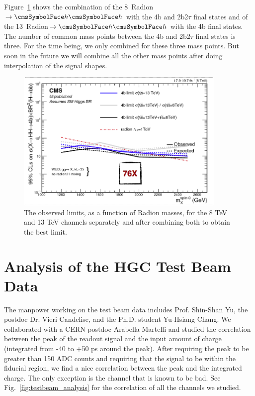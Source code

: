 Figure~\ref{fig:combinedhh4b} shows the combination of the 8~\TeV Radion$\rightarrow\Ph\Ph$ with 
the 4b and 2b2$\tau$ final states and of the 13~\TeV Radion$\rightarrow\Ph\Ph$ with the 4b final 
states. The number of common mass points between the  4b and 2b2$\tau$ final states is three. For the 
time being, we only combined for these three mass points. But soon in the future we will 
combine all the other mass points after doing interpolation of the signal shapes.

\begin{figure}[htbp]
   \centering
   \includegraphics[width=0.9\textwidth]{figures/hh_combined.png}
   \caption{The observed limits, as a function of Radion masses, for the 8 TeV and 13 TeV channels separately 
and after combining both to obtain the best limit.}
   \label{fig:combinedhh4b}
\end{figure}


\section{Analysis of the HGC Test Beam Data}
The manpower working on the test beam data includes Prof. Shin-Shan Yu, the postdoc Dr. Vieri Candelise, and the 
Ph.D. student Yu-Hsiang Chang. We collaborated with a CERN postdoc Arabella Martelli and studied the correlation 
between the peak of the readout signal and the input amount of charge (integrated from -40 to +50 ps around the 
peak). After requiring the peak to be greater than 150 ADC counts and requiring that the signal to be within the 
fiducial region, we find a nice correlation between the peak and the integrated charge. The only exception is 
the channel that is known to be bad.
See Fig.~\ref{fig:testbeam_analysis} for the correlation of all the channels we studied.

